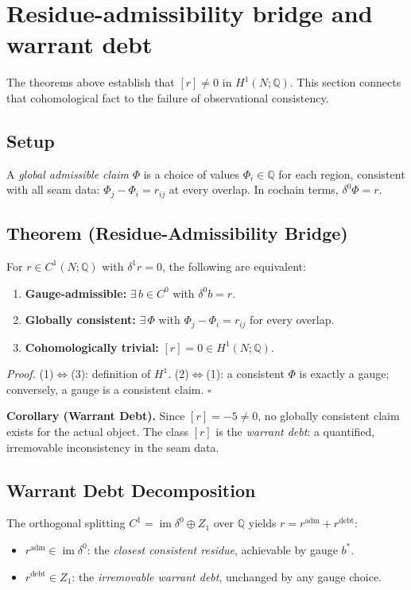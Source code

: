 \documentclass[11pt]{article}
\begin{document}
\section{Residue-admissibility bridge and warrant debt}\label{sec:bridge}

The theorems above establish that $[r]\neq0$ in $H^1(N;\mathbb{Q})$. This
section connects that cohomological fact to the failure of observational
consistency.

\subsection*{Setup}
A \emph{global admissible claim} $\Phi$ is a choice of values $\Phi_i\in\mathbb{Q}$
for each region, consistent with all seam data: $\Phi_j-\Phi_i=r_{ij}$ at
every overlap. In cochain terms, $\delta^0\Phi=r$.

\subsection*{Theorem (Residue-Admissibility Bridge)}
For $r\in C^1(N;\mathbb{Q})$ with $\delta^1 r=0$, the following are equivalent:
\begin{enumerate}
\item \textbf{Gauge-admissible:} $\exists\,b\in C^0$ with $\delta^0 b=r$.
\item \textbf{Globally consistent:} $\exists\,\Phi$ with $\Phi_j-\Phi_i=r_{ij}$
  for every overlap.
\item \textbf{Cohomologically trivial:} $[r]=0\in H^1(N;\mathbb{Q})$.
\end{enumerate}
\textit{Proof.} (1)$\Leftrightarrow$(3): definition of $H^1$.
(2)$\Leftrightarrow$(1): a consistent $\Phi$ is exactly a gauge; conversely,
a gauge is a consistent claim. $\square$

\textbf{Corollary (Warrant Debt).}
Since $[r]=-5\neq0$, no globally consistent claim exists for the actual object.
The class $[r]$ is the \emph{warrant debt}: a quantified, irremovable
inconsistency in the seam data.

\subsection*{Warrant Debt Decomposition}
The orthogonal splitting $C^1=\operatorname{im}\delta^0\oplus Z_1$ over
$\mathbb{Q}$ yields $r=r^{\mathrm{adm}}+r^{\mathrm{debt}}$:
\begin{itemize}
\item $r^{\mathrm{adm}}\in\operatorname{im}\delta^0$: the \emph{closest
  consistent residue}, achievable by gauge $b^*$.
\item $r^{\mathrm{debt}}\in Z_1$: the \emph{irremovable warrant debt},
  unchanged by any gauge choice.
\end{itemize}
\end{document}

